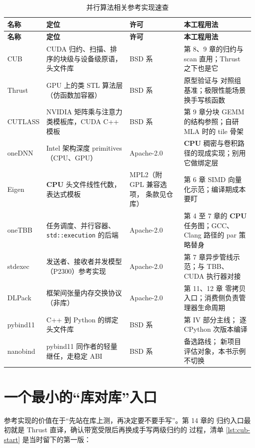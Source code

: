 \documentclass[12pt,a4paper,fontset=fandol]{ctexbook}
\newcommand{\Tp}[1]{\texttt{#1}}
\newcommand{\Dom}[1]{\textsf{\bfseries #1}}
\newcommand{\CPU}{\Dom{CPU}}
\begin{document}
\begin{longtable}{@{}>{\raggedright\arraybackslash}p{}
  >{\raggedright\arraybackslash}p{}
  >{\raggedright\arraybackslash}p{}
  >{\raggedright\arraybackslash}p{}@{}}
\caption{并行算法相关参考实现速查}\label{tab:ref-libs}\\
\toprule
\textbf{名称} & \textbf{定位} & \textbf{许可} & \textbf{本工程用法} \\
\midrule
\endfirsthead
\toprule
\textbf{名称} & \textbf{定位} & \textbf{许可} & \textbf{本工程用法} \\
\midrule
\endhead
\bottomrule
\endfoot
CUB & CUDA 归约、扫描、排序的块级与设备级原语，头文件库 & BSD 系 &
第 8、9 章的归约与 scan 直用；Thrust 之下也是它 \\
Thrust & GPU 上的类 STL 算法层（仿函数加容器） & BSD 系 & 原型验证与
对照组基准；极限性能场景换手写核函数 \\
CUTLASS & NVIDIA 矩阵乘与注意力类模板库，CUDA C++ 模板 & BSD 系 &
第 9 章分块 GEMM 的结构参照；自研 MLA 时的 tile 骨架 \\
oneDNN & Intel 架构深度 primitives（CPU、GPU） & Apache-2.0 & \CPU{}
稠密与卷积路径的现成实现；别用它做绑定层 \\
Eigen & \CPU{} 头文件线性代数，表达式模板 & MPL2（附 GPL 兼容选项，
条款见仓库） & 第 6 章 SIMD 向量化示范；编译期成本要盯 \\
oneTBB & 任务调度、并行容器、\Tp{std::execution} 的后端 & Apache-2.0 &
第 4 至 7 章的 \CPU{}任务图；GCC、Clang 路径的 par 策略替身 \\
stdexec & 发送者、接收者并发模型（P2300）参考实现 & Apache-2.0 &
第 7 章异步管线示范；与 TBB、CUDA 执行器对接 \\
DLPack & 框架间张量内存交换协议（非库） & Apache-2.0 & 第 11、12 章
零拷贝入口；消费侧负责管理器生命周期 \\
pybind11 & C++ 到 Python 的绑定头文件库 & BSD 系 & 第 IV 部分主线；
逐 CPython 次版本编译 \\
nanobind & pybind11 同作者的轻量继任，走稳定 ABI & BSD 系 & 备选路线；
新项目评估对象，本书示例不切换 \\
\end{longtable}

\section{一个最小的``库对库''入口}

参考实现的价值在于``先站在库上测，再决定要不要手写''。第 14 章的
归约入口最初就是 Thrust 直译，确认带宽受限后再换成手写两级归约的
过程，清单 \ref{lst:cub-start} 是当时留下的第一版：
\end{document}
